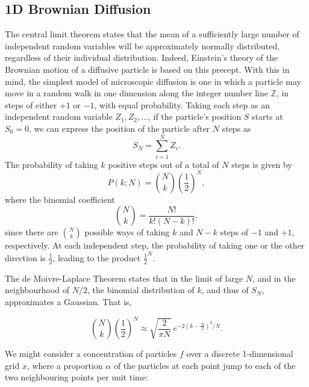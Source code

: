 	\subsection{1D Brownian Diffusion} %
	\label{sub:a_1d_random_walk_analogy}
	  The central limit theorem states that the mean of a sufficiently large number of independent random variables will be approximately normally distributed, regardless of their individual distribution. Indeed, Einstein's theory of the Brownian motion of a diffusive particle is based on this precept. With this in mind, the simplest model of microscopic diffusion is one in which a particle may move in a random walk in one dimension along the integer number line $\mathbb{Z}$, in steps of either $+1$ or $-1$, with equal probability. Taking each step as an independent random variable $Z_1, Z_2,\ldots$, if the particle's position $S$ starts at $S_0 = 0$, we can express the position of the particle after $N$ steps as
	  \begin{equation}
	    S_N = \sum\limits_{i=1}^N Z_i .
	  \end{equation}
	  The probability of taking $k$ positive steps out of a total of $N$ steps is given by
	  \begin{equation}
	    P(k;N) = \binom{N}{k}\left(\frac{1}{2} \right)^N,
	  \end{equation}
	  where the binomial coefficient
	  \begin{equation}
	    \label{eq:registration:binomial-coefficient}
	     \binom{N}{k} = \frac{N!}{k!(N-k)!},
	  \end{equation}
	  since there are $\binom{N}{k}$ possible ways of taking $k$ and $N - k$ steps of $-1$ and $+1$, respectively. At each independent step, the probability of taking one or the other direction is $\frac{1}{2}$, leading to the product $\frac{1}{2}^N$.
  
	  The de Moivre-Laplace Theorem states that in the limit of large $N$, and in the neighbourhood of $N/2$, the binomial distribution of $k$, and thus of $S_N$, approximates a Gaussian. That is,
    
	  \begin{equation}
	    \label{eq:registration:gaussian-approximation}
	    \binom{N}{k}\left(\frac{1}{2}\right)^N \approx \sqrt{\frac{2}{\pi N}} \
	      e^{-2(k - \frac{N}{2})^2/N}.
	  \end{equation}
    
	  We might consider a concentration of particles $f$ over a discrete 1-dimensional grid $x$, where a proportion $\alpha$ of the particles at each point jump to each of the two neighbouring points per unit time:
    
